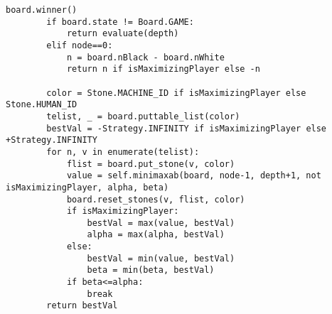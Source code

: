 \documentclass[uplatex,a4paper,11pt,oneside,openany]{jsbook}
\begin{document}
\begin{lstlisting}[caption=Strategy class,label=othello06]
        board.winner()
        if board.state != Board.GAME:
            return evaluate(depth)
        elif node==0:
            n = board.nBlack - board.nWhite
            return n if isMaximizingPlayer else -n

        color = Stone.MACHINE_ID if isMaximizingPlayer else Stone.HUMAN_ID
        telist, _ = board.puttable_list(color)
        bestVal = -Strategy.INFINITY if isMaximizingPlayer else +Strategy.INFINITY
        for n, v in enumerate(telist):
            flist = board.put_stone(v, color)
            value = self.minimaxab(board, node-1, depth+1, not isMaximizingPlayer, alpha, beta)
            board.reset_stones(v, flist, color)
            if isMaximizingPlayer:
                bestVal = max(value, bestVal)
                alpha = max(alpha, bestVal)
            else:
                bestVal = min(value, bestVal)
                beta = min(beta, bestVal)
            if beta<=alpha:
                break
        return bestVal
\end{lstlisting}



%
\begin{thebibliography}{99}
\end{thebibliography}
%
\end{document}
